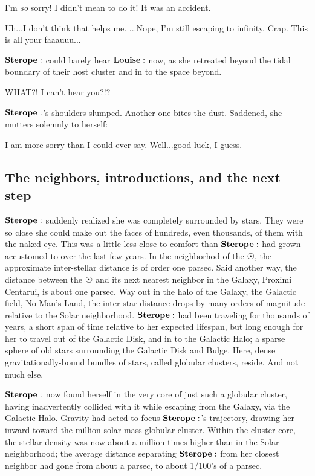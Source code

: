 \Sterope I'm \textit{so} sorry!  I didn't mean to do it!  It was an accident.  

\Louise Uh...I don't think that helps me.  ...Nope, I'm still escaping to infinity.  Crap.  This is all your faaauuu...

$\Sterope$ could barely hear $\Louise$ now, as she retreated beyond the tidal boundary of their host cluster and in to the space beyond.  

\Sterope WHAT?! I can't hear you?!?

$\Sterope$'s shoulders slumped.  Another one bites the dust.  Saddened, she mutters solemnly to herself:

\Sterope I am more sorry than I could ever say.  Well...good luck, I guess.  

\subsection{The neighbors, introductions, and the next step}

$\Sterope$ suddenly realized she was completely surrounded by stars.  They were so close she could make out the faces of hundreds, even thousands, of them with the naked eye.  This was a little less close to comfort than $\Sterope$ had grown accustomed to over the last few years.  In the neighborhod of the $\Sun$, the approximate inter-stellar distance is of order one parsec.  Said another way, the distance between the $\Sun$ and its next nearest neighbor in the Galaxy, Proximi Centarui, is about one parsec.  Way out in the halo of the Galaxy, the Galactic field, No Man's Land, the inter-star distance drops by many orders of magnitude relative to the Solar neighborhood.  $\Sterope$ had been traveling for thousands of years, a short span of time relative to her expected lifespan, but long enough for her to travel out of the Galactic Disk, and in to the Galactic Halo; a sparse sphere of old stars surrounding the Galactic Disk and Bulge.  Here, dense gravitationally-bound bundles of stars, called globular clusters, reside.  And not much else.

$\Sterope$ now found herself in the very core of just such a globular cluster, having inadvertently collided with it while escaping from the Galaxy, via the Galactic Halo.  Gravity had acted to focus $\Sterope$'s trajectory, drawing her inward toward the million solar mass globular cluster.  Within the cluster core, the stellar density was now about a million times higher than in the Solar neighborhood; the average distance separating $\Sterope$ from her closest neighbor had gone from about a parsec, to about 1/100's of a parsec.  

